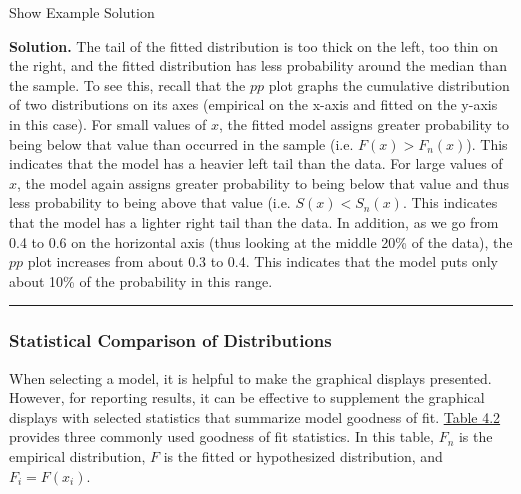 \documentclass[]{book}
\theoremstyle{definition}
\theoremstyle{definition}
\theoremstyle{definition}
\theoremstyle{remark}
\begin{document}
Show Example Solution

\hypertarget{toggleExampleSelect.1.6}{}
\textbf{Solution.} The tail of the fitted distribution is too thick on
the left, too thin on the right, and the fitted distribution has less
probability around the median than the sample. To see this, recall that
the \(pp\) plot graphs the cumulative distribution of two distributions
on its axes (empirical on the x-axis and fitted on the y-axis in this
case). For small values of \(x\), the fitted model assigns greater
probability to being below that value than occurred in the sample (i.e.
\(F(x) > F_n(x)\)). This indicates that the model has a heavier left
tail than the data. For large values of \(x\), the model again assigns
greater probability to being below that value and thus less probability
to being above that value (i.e. \(S(x) < S_n(x)\). This indicates that
the model has a lighter right tail than the data. In addition, as we go
from 0.4 to 0.6 on the horizontal axis (thus looking at the middle 20\%
of the data), the \(pp\) plot increases from about 0.3 to 0.4. This
indicates that the model puts only about 10\% of the probability in this
range.

\begin{center}\rule{0.5\linewidth}{\linethickness}\end{center}

\subsubsection{Statistical Comparison of
Distributions}\label{S:MS:Tools:Stats}

When selecting a model, it is helpful to make the graphical displays
presented. However, for reporting results, it can be effective to
supplement the graphical displays with selected statistics that
summarize model goodness of fit. \protect\hyperlink{tab:42}{Table 4.2}
provides three commonly used goodness of fit statistics. In this table,
\(F_n\) is the empirical distribution, \(F\) is the fitted or
hypothesized distribution, and \(F_i = F(x_i)\).
\end{document}
